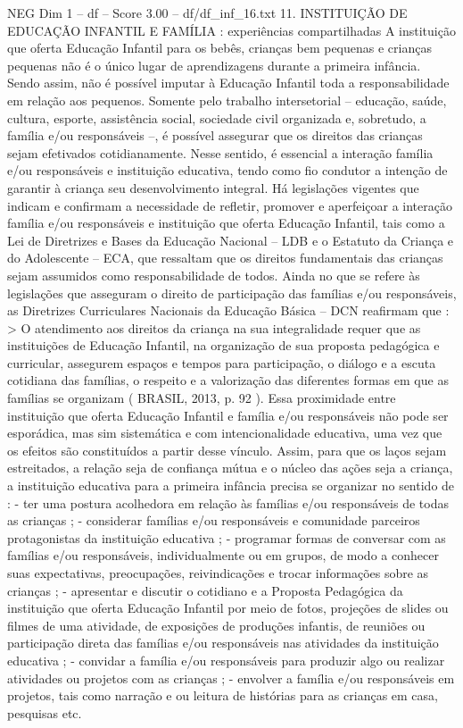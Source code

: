 \begin{textsample}{NEG Dim 1 – df – Score 3.00 – df/df\_inf\_16.txt}  \label{ex:f1_neg_163}
11.
INSTITUIÇÃO DE EDUCAÇÃO INFANTIL E FAMÍLIA : experiências compartilhadas A instituição que oferta Educação Infantil para os bebês, crianças bem pequenas e crianças pequenas não é o único lugar de aprendizagens durante a primeira infância.
Sendo assim, não é possível imputar à Educação Infantil toda a responsabilidade em relação aos pequenos.
Somente pelo trabalho intersetorial – educação, saúde, cultura, esporte, assistência social, sociedade civil organizada e, sobretudo, a família e/ou responsáveis –, é possível assegurar que os direitos das crianças sejam efetivados cotidianamente.
Nesse sentido, é essencial a interação família e/ou responsáveis e instituição educativa, tendo como fio condutor a intenção de garantir à criança seu desenvolvimento integral.
Há legislações vigentes que indicam e confirmam a necessidade de refletir, promover e aperfeiçoar a interação família e/ou responsáveis e instituição que oferta Educação Infantil, tais como a Lei de Diretrizes e Bases da Educação Nacional – LDB e o Estatuto da Criança e do Adolescente – ECA, que ressaltam que os direitos fundamentais das crianças sejam assumidos como responsabilidade de todos.
Ainda no que se refere às legislações que asseguram o direito de participação das famílias e/ou responsáveis, as Diretrizes Curriculares Nacionais da Educação Básica – DCN reafirmam que : > O atendimento aos direitos da criança na sua integralidade requer que as instituições de Educação Infantil, na organização de sua proposta pedagógica e curricular, assegurem espaços e tempos para participação, o diálogo e a escuta cotidiana das famílias, o respeito e a valorização das diferentes formas em que as famílias se organizam ( BRASIL, 2013, p. 92 ).
Essa proximidade entre instituição que oferta Educação Infantil e família e/ou responsáveis não pode ser esporádica, mas sim sistemática e com intencionalidade educativa, uma vez que os efeitos são constituídos a partir desse vínculo.
Assim, para que os laços sejam estreitados, a relação seja de confiança mútua e o núcleo das ações seja a criança, a instituição educativa para a primeira infância precisa se organizar no sentido de : - ter uma postura acolhedora em relação às famílias e/ou responsáveis de todas as crianças ; - considerar famílias e/ou responsáveis e comunidade parceiros protagonistas da instituição educativa ; - programar formas de conversar com as famílias e/ou responsáveis, individualmente ou em grupos, de modo a conhecer suas expectativas, preocupações, reivindicações e trocar informações sobre as crianças ; - apresentar e discutir o cotidiano e a Proposta Pedagógica da instituição que oferta Educação Infantil por meio de fotos, projeções de slides ou filmes de uma atividade, de exposições de produções infantis, de reuniões ou participação direta das famílias e/ou responsáveis nas atividades da instituição educativa ; - convidar a família e/ou responsáveis para produzir algo ou realizar atividades ou projetos com as crianças ; - envolver a família e/ou responsáveis em projetos, tais como narração e ou leitura de histórias para as crianças em casa, pesquisas etc.

\end{textsample}
